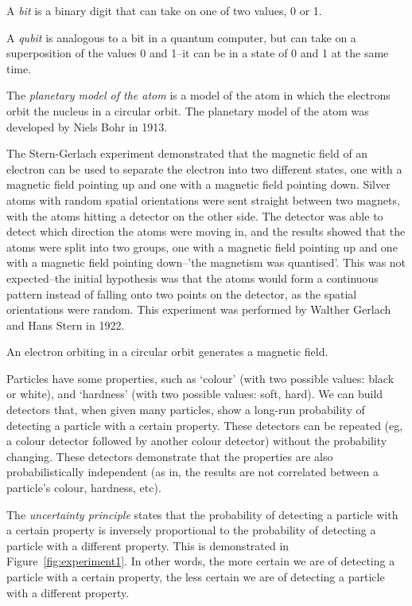 
\begin{definition}
    A \emph{bit} is a binary digit that can take on one of two values, 0 or 1.
\end{definition}
\begin{definition}
    A \emph{qubit} is analogous to a bit in a quantum computer, but can take on a superposition of the values 0 and 1–it can be in a state of 0 and 1 at the same time.
\end{definition}
\begin{definition}
    The \emph{planetary model of the atom} is a model of the atom in which the electrons orbit the nucleus in a circular orbit. The planetary model of the atom was developed by Niels Bohr in 1913.
\end{definition}
The Stern-Gerlach experiment demonstrated that the magnetic field of an electron can be used to separate the electron into two different states, one with a magnetic field pointing up and one with a magnetic field pointing down. Silver atoms with random spatial orientations were sent straight between two magnets, with the atoms hitting a detector on the other side. The detector was able to detect which direction the atoms were moving in, and the results showed that the atoms were split into two groups, one with a magnetic field pointing up and one with a magnetic field pointing down–'the magnetism was quantised'. This was not expected–the initial hypothesis was that the atoms would form a continuous pattern instead of falling onto two points on the detector, as the spatial orientations were random. This experiment was performed by Walther Gerlach and Hans Stern in 1922.
\begin{note}
    An electron orbiting in a circular orbit generates a magnetic field.
\end{note}
Particles have some properties, such as `colour' (with two possible values: black or white), and `hardness' (with two possible values: soft, hard). We can build detectors that, when given many particles, show a long-run probability of detecting a particle with a certain property. These detectors can be repeated (eg, a colour detector followed by another colour detector) without the probability changing. These detectors demonstrate that the properties are also probabilistically independent (as in, the results are not correlated between a particle's colour, hardness, etc).

\begin{definition}
    The \emph{uncertainty principle} states that the probability of detecting a particle with a certain property is inversely proportional to the probability of detecting a particle with a different property. This is demonstrated in Figure~\ref{fig:experiment1}. In other words, the more certain we are of detecting a particle with a certain property, the less certain we are of detecting a particle with a different property.
\end{definition}

